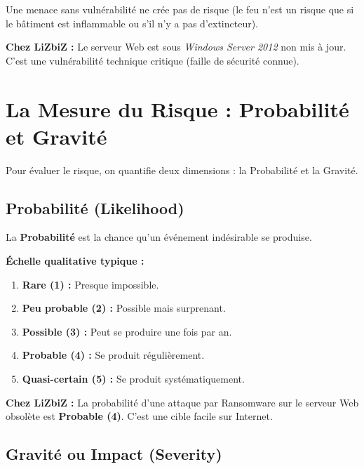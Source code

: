 \begin{boxalert}
Une menace sans vulnérabilité ne crée pas de risque (le feu n'est un risque que si le bâtiment est inflammable ou s'il n'y a pas d'extincteur).
\end{boxalert}

\begin{boxlizbiz}
\textbf{Chez LiZbiZ :} Le serveur Web est sous \textit{Windows Server 2012} non mis à jour. C'est une vulnérabilité technique critique (faille de sécurité connue).
\end{boxlizbiz}

\section{La Mesure du Risque : Probabilité et Gravité}

Pour évaluer le risque, on quantifie deux dimensions : la Probabilité et la Gravité.

\subsection{Probabilité (Likelihood)}

La \textbf{Probabilité} est la chance qu'un événement indésirable se produise.

\textbf{Échelle qualitative typique :}
\begin{enumerate}
    \item \textbf{Rare (1) :} Presque impossible.
    \item \textbf{Peu probable (2) :} Possible mais surprenant.
    \item \textbf{Possible (3) :} Peut se produire une fois par an.
    \item \textbf{Probable (4) :} Se produit régulièrement.
    \item \textbf{Quasi-certain (5) :} Se produit systématiquement.
\end{enumerate}

\begin{boxlizbiz}
\textbf{Chez LiZbiZ :} La probabilité d'une attaque par Ransomware sur le serveur Web obsolète est \textbf{Probable (4)}. C'est une cible facile sur Internet.
\end{boxlizbiz}

\subsection{Gravité ou Impact (Severity)}

